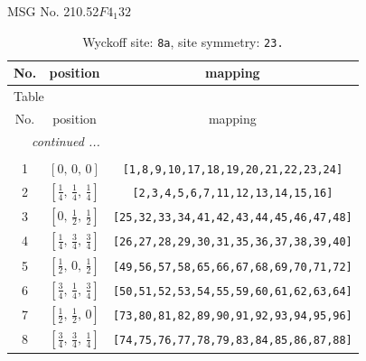 \documentclass[fleqn,8pt]{jsarticle}
\begin{document}
\setcounter{MaxMatrixCols}{32}

\renewcommand{\tablename}{Table~}
\renewcommand{\figurename}{Figure~}
\begin{center}
\LARGE
MSG No. 210.52\quad$F4_{1}32$
\end{center}
\renewcommand{\arraystretch}{1.2}
\begin{longtable}{ccc}
\caption{Wyckoff site: {\tt 8a}, site symmetry: {\tt 23.}}
 \\
 \hline \hline
No. & position & mapping \\ \hline \endfirsthead

\multicolumn{2}{l}{\tablename\ \thetable{}} \\
 \hline \hline
No. & position & mapping \\ \hline \endhead

 \hline \hline
\multicolumn{2}{r}{\footnotesize\it continued ...} \\ \endfoot

 \hline \hline
\multicolumn{2}{r}{} \\ \endlastfoot

1 & $\left[ 0,\, 0,\, 0 \right]$ & {\tt [1,8,9,10,17,18,19,20,21,22,23,24]} \\ \hline
2 & $\left[ \frac{1}{4},\, \frac{1}{4},\, \frac{1}{4} \right]$ & {\tt [2,3,4,5,6,7,11,12,13,14,15,16]} \\ \hline
3 & $\left[ 0,\, \frac{1}{2},\, \frac{1}{2} \right]$ & {\tt [25,32,33,34,41,42,43,44,45,46,47,48]} \\ \hline
4 & $\left[ \frac{1}{4},\, \frac{3}{4},\, \frac{3}{4} \right]$ & {\tt [26,27,28,29,30,31,35,36,37,38,39,40]} \\ \hline
5 & $\left[ \frac{1}{2},\, 0,\, \frac{1}{2} \right]$ & {\tt [49,56,57,58,65,66,67,68,69,70,71,72]} \\ \hline
6 & $\left[ \frac{3}{4},\, \frac{1}{4},\, \frac{3}{4} \right]$ & {\tt [50,51,52,53,54,55,59,60,61,62,63,64]} \\ \hline
7 & $\left[ \frac{1}{2},\, \frac{1}{2},\, 0 \right]$ & {\tt [73,80,81,82,89,90,91,92,93,94,95,96]} \\ \hline
8 & $\left[ \frac{3}{4},\, \frac{3}{4},\, \frac{1}{4} \right]$ & {\tt [74,75,76,77,78,79,83,84,85,86,87,88]} \\
\end{longtable}
\renewcommand{\arraystretch}{1.2}
\end{document}
